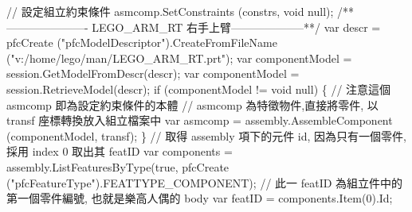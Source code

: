 \documentclass[]{article}
\newenvironment{Shaded}{}{}
\newcommand{\StringTok}[1]{\textcolor[rgb]{0.25,0.44,0.63}{{#1}}}
\begin{document}
\begin{Shaded}
\begin{Highlighting}[]
\StringTok{// 設定組立約束條件}
\StringTok{asmcomp.SetConstraints (constrs, void null);}
\StringTok{/**---------------------- LEGO_ARM_RT 右手上臂--------------------**/}
\StringTok{var descr = pfcCreate ("pfcModelDescriptor").CreateFromFileName ("v:/home/lego/man/LEGO_ARM_RT.prt");}
\StringTok{var componentModel = session.GetModelFromDescr(descr);}
\StringTok{var componentModel = session.RetrieveModel(descr);}
\StringTok{if (componentModel != void null)}
\StringTok{\{}
\StringTok{        // 注意這個 asmcomp 即為設定約束條件的本體}
\StringTok{        // asmcomp 為特徵物件,直接將零件, 以 transf 座標轉換放入組立檔案中}
\StringTok{var asmcomp = assembly.AssembleComponent (componentModel, transf);}
\StringTok{\}}
\StringTok{// 取得 assembly 項下的元件 id, 因為只有一個零件, 採用 index 0 取出其 featID}
\StringTok{var components = assembly.ListFeaturesByType(true, pfcCreate ("pfcFeatureType").FEATTYPE_COMPONENT);}
\StringTok{// 此一 featID 為組立件中的第一個零件編號, 也就是樂高人偶的 body}
\StringTok{var featID = components.Item(0).Id;}


\end{Highlighting}
\end{Shaded}
\end{document}
